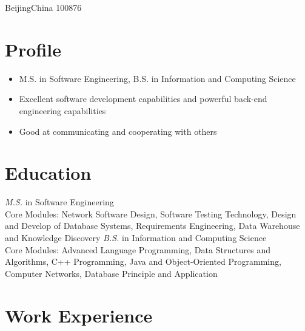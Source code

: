 \documentclass{resume}
\begin{document}

\address{10 Xitucheng Road, Haidian Dist}{Beijing}{China 100876}


\section{Profile}
\begin{itemize}
  \item M.S. in Software Engineering, B.S. in Information and Computing Science
  \item Excellent software development capabilities and powerful back-end engineering capabilities
  \item Good at communicating and cooperating with others
\end{itemize}


\section{Education}
\textit{M.S.} in Software Engineering
\\Core Modules: Network Software Design, Software Testing Technology, Design and Develop of Database Systems, Requirements Engineering, Data Warehouse and Knowledge Discovery
\textit{B.S.} in Information and Computing Science
\\Core Modules: Advanced Language Programming, Data Structures and Algorithms, C++ Programming, Java and Object-Oriented Programming, Computer Networks, Database Principle and Application

\section{Work Experience}
\end{document}
